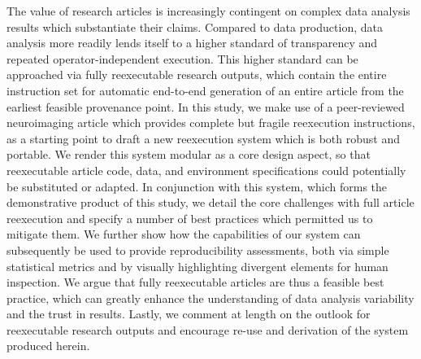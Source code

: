 The value of research articles is increasingly contingent on complex data analysis results which substantiate their claims.
Compared to data production, data analysis more readily lends itself to a higher standard of transparency and repeated operator-independent execution.
This higher standard can be approached via fully reexecutable research outputs, which contain the entire instruction set for automatic end-to-end generation of an entire article from the earliest feasible provenance point.
In this study, we make use of a peer-reviewed neuroimaging article which provides complete but fragile reexecution instructions, as a starting point to draft a new reexecution system which is both robust and portable.
We render this system modular as a core design aspect, so that reexecutable article code, data, and environment specifications could potentially be substituted or adapted.
In conjunction with this system, which forms the demonstrative product of this study, we detail the core challenges with full article reexecution and specify a number of best practices which permitted us to mitigate them.
We further show how the capabilities of our system can subsequently be used to provide reproducibility assessments, both via simple statistical metrics and by visually highlighting divergent elements for human inspection.
We argue that fully reexecutable articles are thus a feasible best practice, which can greatly enhance the understanding of data analysis variability and the trust in results.
Lastly, we comment at length on the outlook for reexecutable research outputs and encourage re-use and derivation of the system produced herein.

